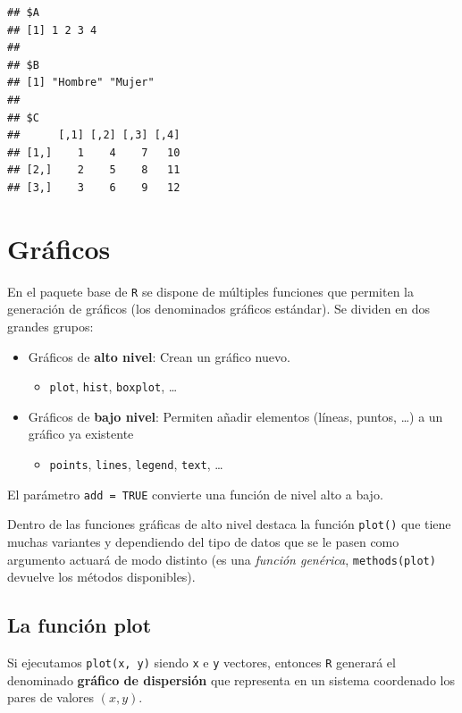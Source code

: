 \documentclass[
]{book}
\providecommand{\tightlist}{%
  \setlength{\itemsep}{0pt}\setlength{\parskip}{0pt}}
\theoremstyle{break}
\theoremstyle{nonumberplain}
\begin{document}
\begin{verbatim}
## $A
## [1] 1 2 3 4
## 
## $B
## [1] "Hombre" "Mujer" 
## 
## $C
##      [,1] [,2] [,3] [,4]
## [1,]    1    4    7   10
## [2,]    2    5    8   11
## [3,]    3    6    9   12
\end{verbatim}

\hypertarget{graficos}{%
\chapter{Gráficos}\label{graficos}}

En el paquete base de \texttt{R} se dispone de múltiples funciones que permiten la generación de gráficos (los denominados gráficos estándar). Se dividen en dos grandes grupos:

\begin{itemize}
\item
  Gráficos de \textbf{alto nivel}: Crean un gráfico nuevo.

  \begin{itemize}
  \tightlist
  \item
    \texttt{plot}, \texttt{hist}, \texttt{boxplot}, \ldots{}
  \end{itemize}
\item
  Gráficos de \textbf{bajo nivel}: Permiten añadir elementos (líneas, puntos, \ldots) a un gráfico ya existente

  \begin{itemize}
  \tightlist
  \item
    \texttt{points}, \texttt{lines}, \texttt{legend}, \texttt{text}, \ldots{}
  \end{itemize}
\end{itemize}

El parámetro \texttt{add\ =\ TRUE} convierte una función de nivel alto a bajo.

Dentro de las funciones gráficas de alto nivel destaca la función \texttt{plot()} que tiene muchas variantes y dependiendo del tipo de datos que se le pasen como argumento actuará de modo distinto
(es una \emph{función genérica}, \texttt{methods(plot)} devuelve los métodos disponibles).

\hypertarget{funcion-plot}{%
\section{La función plot}\label{funcion-plot}}

Si ejecutamos \texttt{plot(x,\ y)} siendo \texttt{x} e \texttt{y} vectores, entonces \texttt{R} generará el denominado \textbf{gráfico de dispersión} que
representa en un sistema coordenado los pares de valores \((x,y)\).
\end{document}
